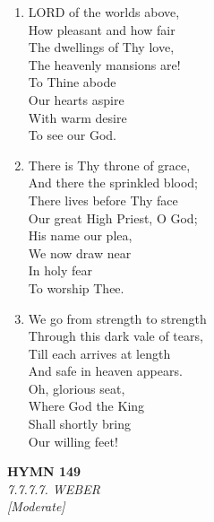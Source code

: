 \documentclass[11pt,a4paper]{article}
\begin{document}
\begin{enumerate}
    \item LORD of the worlds above, \\
        How pleasant and how fair \\
        The dwellings of Thy love, \\
        The heavenly mansions are! \\
        To Thine abode \\
        Our hearts aspire \\
        With warm desire \\
        To see our God.

    \item There is Thy throne of grace, \\
        And there the sprinkled blood; \\
        There lives before Thy face \\
        Our great High Priest, O God; \\
        His name our plea, \\
        We now draw near \\
        In holy fear \\
        To worship Thee.

    \item We go from strength to strength \\
        Through this dark vale of tears, \\
        Till each arrives at length \\
        And safe in heaven appears. \\
        Oh, glorious seat, \\
        Where God the King \\
        Shall shortly bring \\
        Our willing feet!

\end{enumerate}

\newpage
\begin{center}
    {\Large \textbf{HYMN 149}}
    \\
    \textit{7.7.7.7. WEBER}
    \\
    \textit{\small [Moderate]}
\end{center}
\vspace{1em}
\end{document}
